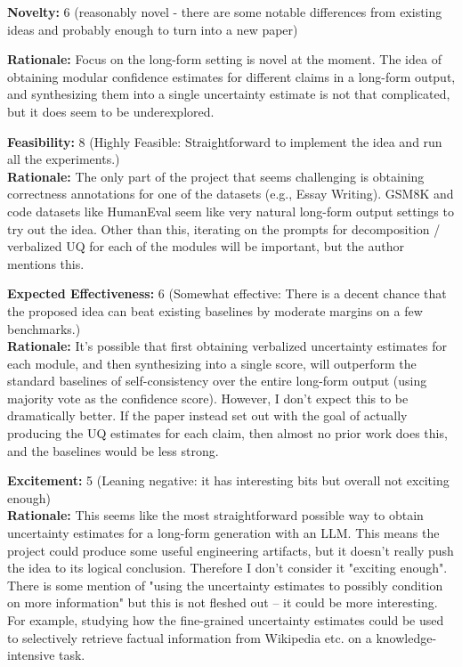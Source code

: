 \begin{tcolorbox}[colback=green!10!white, colframe=green!80!black, title=\textbf{Reviewer 1}]
\small
\textbf{Novelty:} 6 (reasonably novel - there are some notable differences from existing ideas and probably enough to turn into a new paper)

\textbf{Rationale:} Focus on the long-form setting is novel at the moment. The idea of obtaining modular confidence estimates for different claims in a long-form output, and synthesizing them into a single uncertainty estimate is not that complicated, but it does seem to be underexplored.

\vspace{10pt} 

\textbf{Feasibility:} 8 (Highly Feasible: Straightforward to implement the idea and run all the experiments.)\\
\textbf{Rationale:} The only part of the project that seems challenging is obtaining correctness annotations for one of the datasets (e.g., Essay Writing). GSM8K and code datasets like HumanEval seem like very natural long-form output settings to try out the idea. Other than this, iterating on the prompts for decomposition / verbalized UQ for each of the modules will be important, but the author mentions this.

\vspace{10pt}

\textbf{Expected Effectiveness:} 6 (Somewhat effective: There is a decent chance that the proposed idea can beat existing baselines by moderate margins on a few benchmarks.)\\
\textbf{Rationale:} It's possible that first obtaining verbalized uncertainty estimates for each module, and then synthesizing into a single score, will outperform the standard baselines of self-consistency over the entire long-form output (using majority vote as the confidence score). However, I don't expect this to be dramatically better. If the paper instead set out with the goal of actually producing the UQ estimates for each claim, then almost no prior work does this, and the baselines would be less strong.

\vspace{10pt}

\textbf{Excitement:} 5 (Leaning negative: it has interesting bits but overall not exciting enough)\\
\textbf{Rationale:} This seems like the most straightforward possible way to obtain uncertainty estimates for a long-form generation with an LLM. This means the project could produce some useful engineering artifacts, but it doesn't really push the idea to its logical conclusion. Therefore I don't consider it "exciting enough". There is some mention of "using the uncertainty estimates to possibly condition on more information" but this is not fleshed out -- it could be more interesting. For example, studying how the fine-grained uncertainty estimates could be used to selectively retrieve factual information from Wikipedia etc. on a knowledge-intensive task.


\end{tcolorbox}
